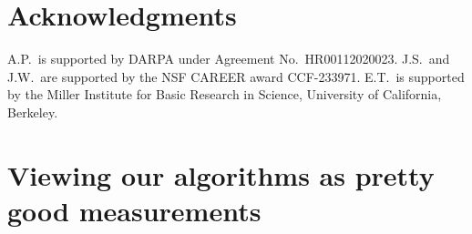 \documentclass{article}
\begin{document}
\section*{Acknowledgments}

A.P.\ is supported by DARPA under Agreement No.\ HR00112020023. 
J.S.\ and J.W.\ are supported by the NSF CAREER award CCF-233971.
E.T.\ is supported by the Miller Institute for Basic Research in Science, University of California, Berkeley. 






\appendix

\section{Viewing our algorithms as pretty good measurements} \label{sec:pgm}


\end{document}
